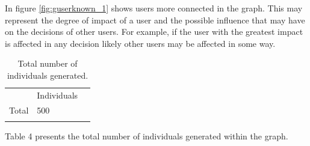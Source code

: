 In figure \ref{fig:guserknown_1} shows users more connected in the graph. This may represent the degree
of impact of a user and the possible influence that may have on the decisions of
other users. For example, if the user with the greatest impact is affected in
any decision likely other users may be affected in some way.


\begin{table}
\small
\caption{Total number of individuals generated.}
\label{tab:totalIndividuals_1} 
\centering
\small
\begin{tabular}{p{3cm} p{3cm} p{3cm} }
\hline\noalign{\smallskip}
  & Individuals &  \\
\noalign{\smallskip}\hline\noalign{\smallskip}
\small{Total } & \small{500} & \\ \hline    
\noalign{\smallskip}\hline
\end{tabular}
\end{table}


Table 4 presents the total number of individuals generated within the graph.

